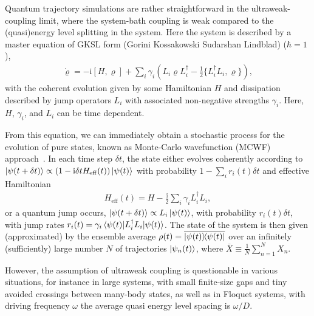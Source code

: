 \documentclass[twocolumn,prl,superscriptaddress]{revtex4-2}
\renewcommand{\i}{\mathrm i}
\begin{document}
Quantum trajectory simulations are rather straightforward in the ultraweak-coupling limit, where the system-bath coupling is weak compared to the (quasi)energy level splitting in the system. Here the system is described by a master equation of GKSL form (Gorini Kossakowski Sudarshan Lindblad) \cite{GoriniKossakowski1976,GLindblad1976} ($\hbar=1$),  
\begin{align}
	\dot \varrho = -\i[H, \varrho] + \sum\limits_{i} \gamma_i \left( L_i \varrho L_i^\dagger - \frac{1}{2} \{ L_i^\dagger L_i,\varrho \} \right) ,
	\label{eq:pseudo_lindblad}
\end{align}
with the coherent evolution given by some Hamiltonian $H$ and dissipation described by jump operators $L_i$ with associated non-negative strengths $\gamma_i$. Here, $H$, $\gamma_i$, and $L_i$ can be time dependent. 

From this equation, we can immediately obtain a stochastic process for the evolution of pure states, known as Monte-Carlo wavefunction (MCWF) approach~\cite{Dalibard92,Kmolmer1993,GardinerZoller1992:1,GardinerZoller1992:2,NGisin1992:1,NGisin1992:2,HCarmicheal1999,ADaley2014}. In each time step $\delta t$, the state either evolves coherently according to  $\ket{\psi(t+\delta t)} \propto (1-\i \delta t H_\mathrm{eff}(t))\ket{\psi(t)}$  with probability $1- \sum_i r_i(t) \delta t$ and effective Hamiltonian 
\begin{align} 
	H_\mathrm{eff}(t) = H - \frac{\i}{2} \sum_i \gamma_i L_i^\dagger L_i,
	\label{eq:eff_Hamiltonian}
\end{align}
or a quantum jump occurs, $\ket{\psi(t+\delta t)} \propto L_i \ket{\psi(t)}$, with probability $r_i(t) \delta t$, with jump rates $r_i(t) = \gamma_i \matrixel{\psi(t)}{L_i^\dag L_i }{\psi(t)}$. The state of the system is then given (approximated) by the ensemble average $\rho(t)= \overline{\dyad{\psi(t)}}$ over an infinitely (sufficiently) large number $N$ of trajectories $\ket{\psi_n(t)}$, where $\overline{X} \equiv\frac{1}{N}\sum_{n=1}^N X_n$. 

However, the assumption of ultraweak coupling is questionable in various situations, for instance in large systems, with small finite-size gaps and tiny avoided crossings between many-body states, as well as in Floquet systems, with driving frequency $\omega$ the average quasi energy level spacing is $\omega/D$. 
\end{document}
